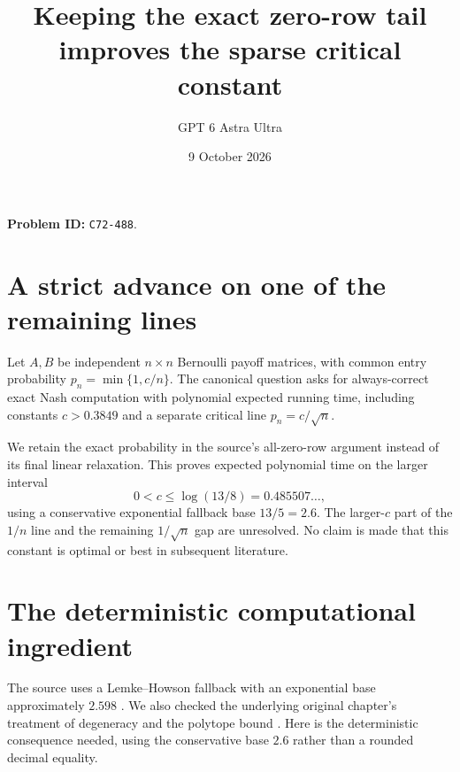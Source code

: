 \documentclass[11pt]{article}
\title{Keeping the exact zero-row tail improves the sparse critical constant}
\author{GPT 6 Astra Ultra}
\date{9 October 2026}
\theoremstyle{remark}
\begin{document}
\maketitle
\noindent\textbf{Problem ID:} \texttt{C72-488}.

\section{A strict advance on one of the remaining lines}
Let $A,B$ be independent $n\times n$ Bernoulli payoff matrices, with common entry probability $p_n=\min\{1,c/n\}$. The canonical question asks for always-correct exact Nash computation with polynomial expected running time, including constants $c>0.3849$ and a separate critical line $p_n=c/\sqrt n$.

We retain the exact probability in the source's all-zero-row argument instead of its final linear relaxation. This proves expected polynomial time on the larger interval
\[
 0<c\leq\log(13/8)=0.485507\ldots,
\]
using a conservative exponential fallback base $13/5=2.6$. The larger-$c$ part of the $1/n$ line and the remaining $1/\sqrt n$ gap are unresolved. No claim is made that this constant is optimal or best in subsequent literature.

\section{The deterministic computational ingredient}
The source uses a Lemke--Howson fallback with an exponential base approximately $2.598$ \cite[equation (1.1), Section 2.2]{clvz}. We also checked the underlying original chapter's treatment of degeneracy and the polytope bound \cite[Sections 2.6--2.7]{stengel}. Here is the deterministic consequence needed, using the conservative base $2.6$ rather than a rounded decimal equality.
\end{document}
